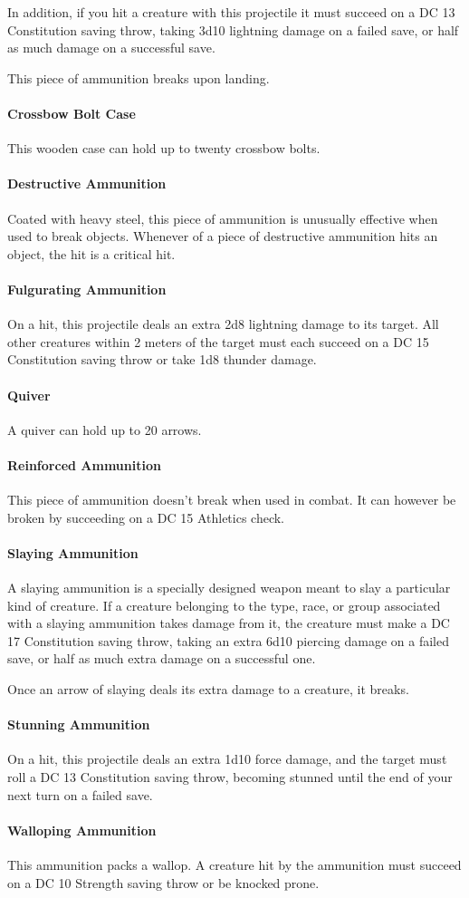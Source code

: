     In addition, if you hit a creature with this projectile it must succeed on a DC 13 Constitution saving throw, taking 3d10 lightning damage on a failed save, or half as much damage on a successful save.

    This piece of ammunition breaks upon landing.
\paragraph{Crossbow Bolt Case}
    This wooden case can hold up to twenty crossbow bolts.
\paragraph{Destructive Ammunition}
    Coated with heavy steel, this piece of ammunition is unusually effective when used to break objects.
    Whenever of a piece of destructive ammunition hits an object, the hit is a critical hit.
\paragraph{Fulgurating Ammunition}
    On a hit, this projectile deals an extra 2d8 lightning damage to its target.
    All other creatures within 2 meters of the target must each succeed on a DC 15 Constitution saving throw or take 1d8 thunder damage.
\paragraph{Quiver}
    A quiver can hold up to 20 arrows.
\paragraph{Reinforced Ammunition}
    This piece of ammunition doesn't break when used in combat.
    It can however be broken by succeeding on a DC 15 Athletics check.
\paragraph{Slaying Ammunition}
    A slaying ammunition is a specially designed weapon meant to slay a particular kind of creature.
    If a creature belonging to the type, race, or group associated with a slaying ammunition takes damage from it, the creature must make a DC 17 Constitution saving throw, taking an extra 6d10 piercing damage on a failed save, or half as much extra damage on a successful one.

    Once an arrow of slaying deals its extra damage to a creature, it breaks.
\paragraph{Stunning Ammunition}
    On a hit, this projectile deals an extra 1d10 force damage, and the target must roll a DC 13 Constitution saving throw, becoming stunned until the end of your next turn on a failed save.
\paragraph{Walloping Ammunition}
    This ammunition packs a wallop.
    A creature hit by the ammunition must succeed on a DC 10 Strength saving throw or be knocked prone.
\pagebreak
